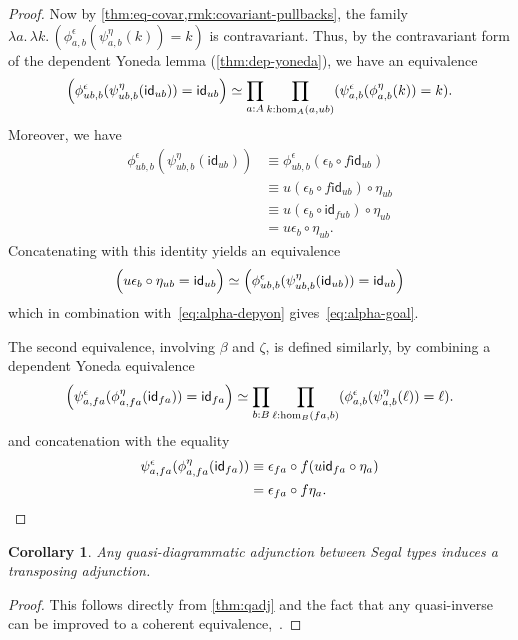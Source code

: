 \documentclass{amsart}
\theoremstyle{plain}
\newtheorem{cor}[thm]{Corollary}
\theoremstyle{definition}
\theoremstyle{remark}
\numberwithin{equation}{section}
\newcommand{\jdeq}{\equiv}
\newcommand{\lam}[1]{\lambda #1.\,}
\newcommand{\idarr}[1]{\mathsf{id}_{#1}}
\newcommand{\Parens}[1]{\Bigl(#1\Bigr)}
\begin{document}
\begin{proof}
  Now by \cref{thm:eq-covar,rmk:covariant-pullbacks}, the family $\lam{a}\lam{k} (\phi^\epsilon_{a,b}(\psi^\eta_{a,b}(k)) = k)$ is contravariant.
  Thus, by the contravariant form of the dependent Yoneda lemma (\cref{thm:dep-yoneda}), we have an equivalence
  \begin{equation}
    \Parens{\phi^\epsilon_{ub,b}(\psi^\eta_{ub,b}(\idarr{ub})) = \idarr{ub}}
    \simeq  \prod_{a:A} \prod_{k:\hom_A(a,ub)} (\psi^\epsilon_{a,b}(\phi^\eta_{a,b}(k)) = k).\label{eq:alpha-depyon}
  \end{equation}
  Moreover, we have
  \begin{align*}
    \phi^\epsilon_{ub,b}(\psi^\eta_{ub,b}(\idarr{ub}))
    &\jdeq \phi^\epsilon_{ub,b}(\epsilon_b \circ f\idarr{ub})\\
    &\jdeq u(\epsilon_b \circ f\idarr{ub}) \circ \eta_{ub}\\
    &\jdeq u(\epsilon_b \circ \idarr{fub}) \circ \eta_{ub}\\
    &= u\epsilon_b \circ \eta_{ub}.
  \end{align*}
  Concatenating with this identity yields an equivalence
  \[ \Parens{u \epsilon_b \circ \eta_{ub} = \idarr{ub}} \simeq \Parens{\phi^\epsilon_{ub,b}(\psi^\eta_{ub,b}(\idarr{ub})) = \idarr{ub}} \]
  which in combination with~\eqref{eq:alpha-depyon} gives~\eqref{eq:alpha-goal}.

  The second equivalence, involving $\beta$ and $\zeta$, is defined similarly, by combining a dependent Yoneda equivalence
  \begin{equation*}
    \Parens{\psi^\epsilon_{a,fa}(\phi^\eta_{a,fa}(\idarr{fa})) = \idarr{fa}}
    \simeq  \prod_{b:B} \prod_{\ell:\hom_B(fa,b)} (\phi^\epsilon_{a,b}(\psi^\eta_{a,b}(\ell)) = \ell).\label{eq:beta-depyon}
  \end{equation*}
  and concatenation with the equality
  \begin{align*}
    \psi^\epsilon_{a,fa}(\phi^\eta_{a,fa}(\idarr{fa}))
    &\jdeq \epsilon_{fa} \circ f(u\idarr{fa} \circ \eta_a)\\
    &= \epsilon_{fa} \circ f\eta_a.\qedhere
  \end{align*}
\end{proof}

\begin{cor}\label{thm:qadj-transp}
  Any quasi-diagrammatic adjunction between Segal types induces a transposing adjunction.
\end{cor}
\begin{proof}
  This follows directly from \cref{thm:qadj} and the fact that any quasi-inverse can be improved to a coherent equivalence,~\cite[Theorem 4.2.3]{hottbook}.
\end{proof}
\end{document}
